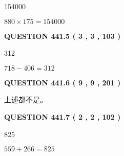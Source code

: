 \documentclass{ctexart}
\begin{document}
  
 
 
\noindent{}

154000
 
 
 
 
\noindent{}

$ %
880 \times  %
175=   %
154000$
 
 
  
\vspace{0.2in}
  
{\textbf{\Large{QUESTION
441.5 
 ( 3 , 3 , 103 )
}}}
  
  
 
 
\noindent{}

312
 
 
 
 
\noindent{}

$ %
718 -  %
406=   %
312$
 
 
  
\vspace{0.2in}
  
{\textbf{\Large{QUESTION
441.6 
 ( 9 , 9 , 201 )
}}}
  
  
 
 
\noindent{}
 
 
 上述都不是。
 
 
 
 
  
\vspace{0.2in}
  
{\textbf{\Large{QUESTION
441.7 
 ( 2 , 2 , 102 )
}}}
  
  
 
 
\noindent{}

825
 
 
 
 
\noindent{}

$ %
559 +  %
266=   %
825$
 
 
  
\vspace{0.2in}
  
\end{document}
